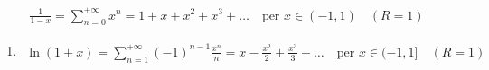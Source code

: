 \documentclass[letterpaper,10pt,italian]{jupyterBook}
\begin{document}
\begin{equation*}
\begin{split}\frac{1}{1-x} = \sum_{n=0}^{+\infty} x^n = 1 + x + x^2 + x^3 + \dots \quad \text{per } x \in (-1, 1) \quad (R = 1)\end{split}
\end{equation*}\begin{enumerate}
%
\setcounter{enumi}{4}
\item {} 
\sphinxAtStartPar
{}
\begin{equation*}
\begin{split}\ln(1+x) = \sum_{n=1}^{+\infty} (-1)^{n-1} \frac{x^n}{n} = x - \frac{x^2}{2} + \frac{x^3}{3} - \dots \quad \text{per } x \in (-1, 1] \quad (R = 1)\end{split}
\end{equation*}
\end{enumerate}
\end{document}
